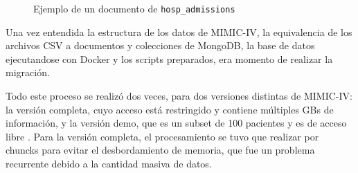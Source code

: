 \begin{figure}[H]
  \centering
  \caption{Ejemplo de un documento de \texttt{hosp\_admissions}}
  \label{fig:screenshot3}
\end{figure}

Una vez entendida la estructura de los datos de MIMIC-IV, la equivalencia de los archivos CSV a documentos y colecciones de MongoDB, la base de datos ejecutandose con Docker y los scripts preparados, era momento de realizar la migración. 

Todo este proceso se realizó dos veces, para dos versiones distintas de MIMIC-IV: la versión completa, cuyo acceso está restringido y contiene múltiples GBs de información, y la versión demo, que es un subset de 100 pacientes y es de acceso libre \cite{MIMICIV_Demo}. Para la versión completa, el procesamiento se tuvo que realizar por chuncks para evitar el desbordamiento de memoria, que fue un problema recurrente debido a la cantidad masiva de datos.

